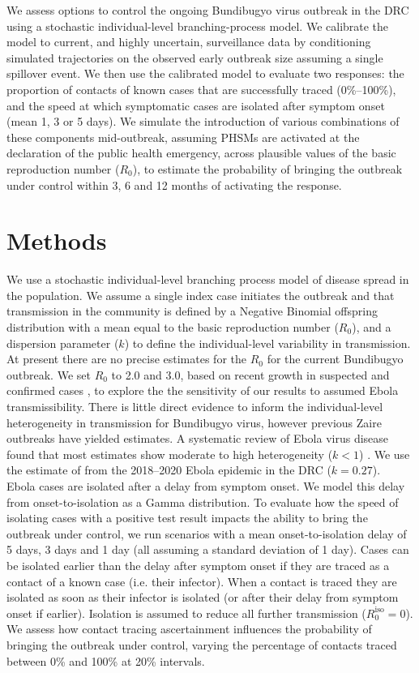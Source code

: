 \documentclass[12pt, letterpaper]{article}
\begin{document}
We assess options to control the ongoing Bundibugyo virus outbreak in the DRC using a stochastic individual-level branching-process model. We calibrate the model to current, and highly uncertain, surveillance data by conditioning simulated trajectories on the observed early outbreak size assuming a single spillover event. We then use the calibrated model to evaluate two responses: the proportion of contacts of known cases that are successfully traced (0\%--100\%), and the speed at which symptomatic cases are isolated after symptom onset (mean 1, 3 or 5 days). We simulate the introduction of various combinations of these components mid-outbreak, assuming PHSMs are activated at the declaration of the public health emergency, across plausible values of the basic reproduction number ($R_0$), to estimate the probability of bringing the outbreak under control within 3, 6 and 12 months of activating the response.

\section*{Methods}

We use a stochastic individual-level branching process model of disease spread in the population. We assume a single index case initiates the outbreak and that transmission in the community is defined by a Negative Binomial offspring distribution with a mean equal to the basic reproduction number ($R_0$), and a dispersion parameter ($k$) to define the individual-level variability in transmission. At present there are no precise estimates for the $R_0$ for the current Bundibugyo outbreak. We set $R_0$ to 2.0 and 3.0, based on recent growth in suspected and confirmed cases \citep{insp2026sitrep010}, to explore the the sensitivity of our results to assumed Ebola transmissibility. There is little direct evidence to inform the individual-level heterogeneity in transmission for Bundibugyo virus, however previous Zaire outbreaks have yielded estimates. A systematic review of Ebola virus disease found that most estimates show moderate to high heterogeneity ($k < 1$) \citep{nash2024ebola}. We use the estimate of \citet{polonsky2021novel} from the 2018--2020 Ebola epidemic in the DRC ($k = 0.27$). \\

Ebola cases are isolated after a delay from symptom onset. We model this delay from onset-to-isolation as a Gamma distribution. To evaluate how the speed of isolating cases with a positive test result impacts the ability to bring the outbreak under control, we run scenarios with a mean onset-to-isolation delay of 5 days, 3 days and 1 day (all assuming a standard deviation of 1 day). Cases can be isolated earlier than the delay after symptom onset if they are traced as a contact of a known case (i.e. their infector). When a contact is traced they are isolated as soon as their infector is isolated (or after their delay from symptom onset if earlier). Isolation is assumed to reduce all further transmission ($R_0^\mathrm{iso} = 0$). We assess how contact tracing ascertainment influences the probability of bringing the outbreak under control, varying the percentage of contacts traced between 0\% and 100\% at 20\% intervals. \\
\end{document}
